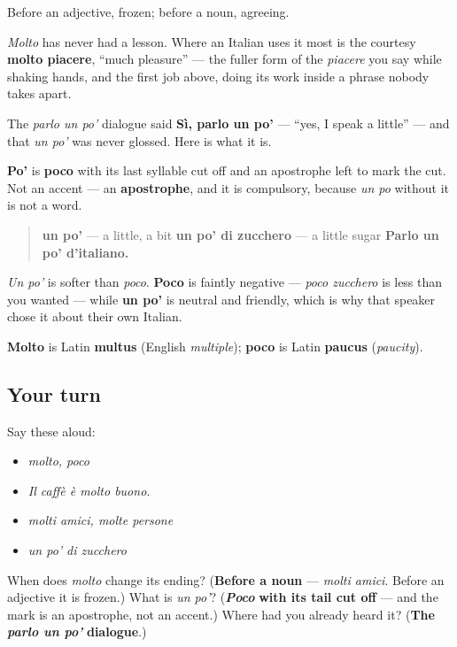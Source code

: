 Before an adjective, frozen; before a noun, agreeing.

\emph{Molto} has never had a lesson. Where an Italian uses it most is the courtesy \textbf{molto piacere}, \textquotedblleft{}much pleasure\textquotedblright{} — the fuller form of the \emph{piacere} you say while shaking hands, and the first job above, doing its work inside a phrase nobody takes apart.

\begin{cousinweb}
The \emph{parlo un po'} dialogue said \textbf{Sì, parlo un po'} — \textquotedblleft{}yes, I speak a little\textquotedblright{} — and that \emph{un po'} was never glossed. Here is what it is.

\textbf{Po'} is \textbf{poco} with its last syllable cut off and an apostrophe left to mark the cut. Not an accent — an \textbf{apostrophe}, and it is compulsory, because \emph{un po} without it is not a word.

\begin{quote}
\textbf{un po'} — a little, a bit \textbf{un po' di zucchero} — a little sugar \textbf{Parlo un po' d'italiano.}
\end{quote}

\emph{Un po'} is softer than \emph{poco}. \textbf{Poco} is faintly negative — \emph{poco zucchero} is less than you wanted — while \textbf{un po'} is neutral and friendly, which is why that speaker chose it about their own Italian.

\textbf{Molto} is Latin \textbf{multus} (English \emph{multiple}); \textbf{poco} is Latin \textbf{paucus} (\emph{paucity}).
\end{cousinweb}

\subsection*{Your turn}
Say these aloud:

\begin{itemize}
\raggedright
  \item \emph{molto, poco}
  \item \emph{Il caffè è molto buono.}
  \item \emph{molti amici, molte persone}
  \item \emph{un po' di zucchero}
\end{itemize}

\begin{tcolorbox}[breakable,colback=teal!4,colframe=teal!35!black,title={Before you move on}]
When does \emph{molto} change its ending? (\textbf{Before a noun} — \emph{molti amici}. Before an adjective it is frozen.) What is \emph{un po'}? (\emph{\textbf{Poco}} \textbf{with its tail cut off} — and the mark is an apostrophe, not an accent.) Where had you already heard it? (\textbf{The} \emph{\textbf{parlo un po'}} \textbf{dialogue}.)
\end{tcolorbox}
